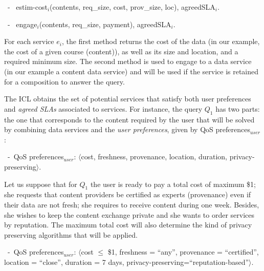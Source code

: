  
\begin{trivlist}\sf\footnotesize
\item[~-~]estim-cost$_i$(contents, req\_size, cost, prov\_size, loc), 
agreedSLA$_i$.

\item[~-~]engage$_i$(contents, req\_size, payment), agreedSLA$_i$.
\end{trivlist}

 

For each service $e_i$, the first method returns the cost of the data (in our example, the cost of a given course (content)), as well as its  size and location,  and a required minimum size.  
The second method is used to engage to a data service (in our example a content data service) and will be used  if the service is retained for a composition to answer the query.

 

The ICL  obtains the set of potential services that satisfy both user preferences and   \textit{agreed SLAs} associated to services. 
For instance, the query $Q_1$ has two parts: the one that corresponds to the content required by the user  that will be solved by combining data services and the \textit{user preferences}, given by {QoS preferences}$_\mathit{user}$:
\begin{trivlist}\sf\footnotesize
\item[~-~QoS preferences$_\mathit{user}$: ] $\langle$cost, freshness, provenance, location, duration, privacy-preserving$\rangle$. 
\end{trivlist}


Let us suppose that for $Q_1$  the user is ready to pay a total cost of maximum  \$1; she requests that content providers be certified as experts (provenance) even if their data are not fresh; she requires to receive content  during  one week. Besides, she wishes to keep the content exchange private and she wants to order services by reputation. The maximum total cost will  also determine the kind of privacy preserving algorithms that will be applied.
 
\begin{trivlist}\sf\footnotesize
\item[~-~QoS preferences$_\mathit{user}$: ] $\langle$cost $\leq$ \$1, freshness = ``any'', provenance = ``certified'', location = ``close'', duration = 7 days, privacy-preserving=``reputation-based''$\rangle$. 
\end{trivlist}



